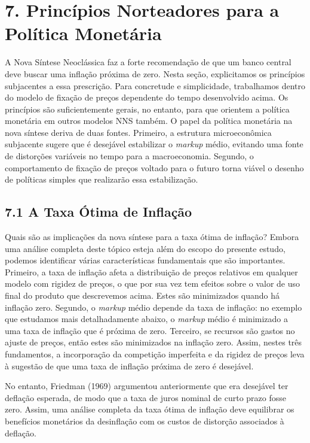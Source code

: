 \documentclass[12pt]{article}
\begin{document}
\section{7. Princípios Norteadores para a Política Monetária}

A Nova Síntese Neoclássica faz a forte recomendação de que um banco central deve buscar uma inflação próxima de zero. Nesta seção, explicitamos os princípios subjacentes a essa prescrição. Para concretude e simplicidade, trabalhamos dentro do modelo de fixação de preços dependente do tempo desenvolvido acima. Os princípios são suficientemente gerais, no entanto, para que orientem a política monetária em outros modelos NNS também. O papel da política monetária na nova síntese deriva de duas fontes. Primeiro, a estrutura microeconômica subjacente sugere que é desejável estabilizar o \textit{markup} médio, evitando uma fonte de distorções variáveis no tempo para a macroeconomia. Segundo, o comportamento de fixação de preços voltado para o futuro torna viável o desenho de políticas simples que realizarão essa estabilização.

\subsection{7.1 A Taxa Ótima de Inflação}

Quais são as implicações da nova síntese para a taxa ótima de inflação? Embora uma análise completa deste tópico esteja além do escopo do presente estudo, podemos identificar várias características fundamentais que são importantes. Primeiro, a taxa de inflação afeta a distribuição de preços relativos em qualquer modelo com rigidez de preços, o que por sua vez tem efeitos sobre o valor de uso final do produto que descrevemos acima. Estes são minimizados quando há inflação zero. Segundo, o \textit{markup} médio depende da taxa de inflação: no exemplo que estudamos mais detalhadamente abaixo, o \textit{markup} médio é minimizado a uma taxa de inflação que é próxima de zero. Terceiro, se recursos são gastos no ajuste de preços, então estes são minimizados na inflação zero. Assim, nestes três fundamentos, a incorporação da competição imperfeita e da rigidez de preços leva à sugestão de que uma taxa de inflação próxima de zero é desejável.

No entanto, Friedman (1969) argumentou anteriormente que era desejável ter deflação esperada, de modo que a taxa de juros nominal de curto prazo fosse zero. Assim, uma análise completa da taxa ótima de inflação deve equilibrar os benefícios monetários da desinflação com os custos de distorção associados à deflação.
\end{document}
